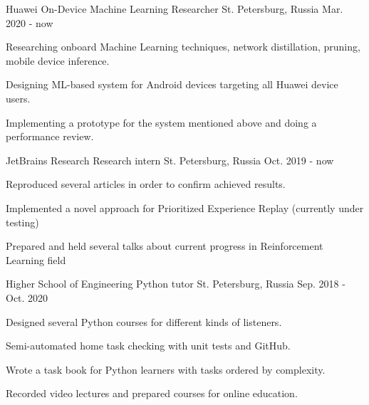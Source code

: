 

\begin{cventries}
	
\cventry
	{Huawei} %
	{On-Device Machine Learning Researcher} %
	{St. Petersburg, Russia} %
	{Mar. 2020 - now} %
	{
		\begin{cvitems} %
			\item {Researching onboard Machine Learning techniques, network distillation, pruning, mobile device inference.}
			\item {Designing ML-based system for Android devices targeting all Huawei device users.}
			\item {Implementing a prototype for the system mentioned above and doing a performance review.}
		\end{cvitems}
	}
	
  \cventry
	{JetBrains Research} %
	{Research intern} %
	{St. Petersburg, Russia} %
	{Oct. 2019 - now} %
	{
		\begin{cvitems} %
			\item {Reproduced several articles in order to confirm achieved results.}
			\item {Implemented a novel approach for Prioritized Experience Replay (currently under testing)}
			\item {Prepared and held several talks about current progress in Reinforcement Learning field}
		\end{cvitems}
}

  \cventry
    {Higher School of Engineering} %
    {Python tutor} %
    {St. Petersburg, Russia} %
    {Sep. 2018 - Oct. 2020} %
    {
		\begin{cvitems} %
		 \item {Designed several Python courses for different kinds of listeners.}
		 \item {Semi-automated home task checking with unit tests and GitHub.}
		 \item {Wrote a task book for Python learners with tasks ordered by complexity.}
		 \item {Recorded video lectures and prepared courses for online education.}
		\end{cvitems}
    }


\end{cventries}
